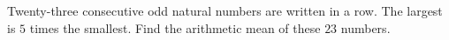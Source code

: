Twenty-three consecutive odd natural numbers are written in a row. The largest is $5$ times the smallest. Find the arithmetic mean of these $23$ numbers.

